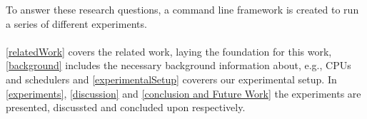 

To answer these research questions, a command line framework is created to run a series of different experiments.

\paragraph{}
\cref{relatedWork} covers the related work, laying the foundation for this work, \cref{background}  includes the necessary background information about, e.g., CPUs and schedulers and \cref{experimentalSetup} coverers our experimental setup. %
In \cref{experiments}, \cref{discussion} and \cref{conclusion and Future Work} the experiments are presented, discussted and concluded upon respectively.


